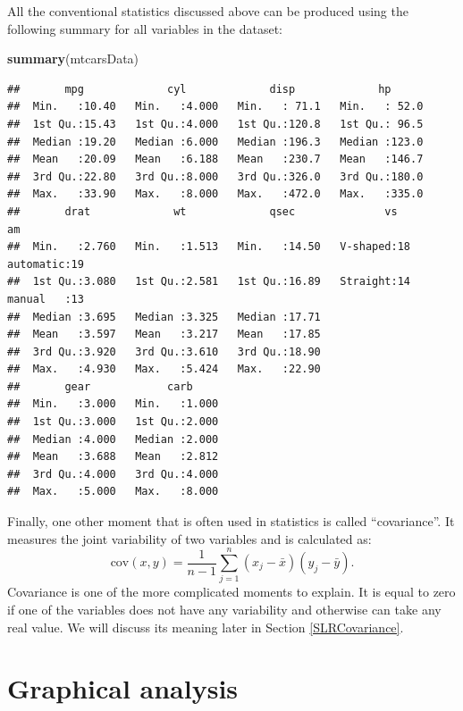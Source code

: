 \documentclass[
]{book}
\newenvironment{Shaded}{\begin{snugshade}}{\end{snugshade}}
\newcommand{\KeywordTok}[1]{\textcolor[rgb]{0.13,0.29,0.53}{\textbf{#1}}}
\newcommand{\NormalTok}[1]{#1}
\theoremstyle{definition}
\theoremstyle{definition}
\theoremstyle{definition}
\theoremstyle{definition}
\theoremstyle{remark}
\begin{document}
All the conventional statistics discussed above can be produced using the following summary for all variables in the dataset:

\begin{Shaded}
\begin{Highlighting}[]
\KeywordTok{summary}\NormalTok{(mtcarsData)}
\end{Highlighting}
\end{Shaded}

\begin{verbatim}
##       mpg             cyl             disp             hp       
##  Min.   :10.40   Min.   :4.000   Min.   : 71.1   Min.   : 52.0  
##  1st Qu.:15.43   1st Qu.:4.000   1st Qu.:120.8   1st Qu.: 96.5  
##  Median :19.20   Median :6.000   Median :196.3   Median :123.0  
##  Mean   :20.09   Mean   :6.188   Mean   :230.7   Mean   :146.7  
##  3rd Qu.:22.80   3rd Qu.:8.000   3rd Qu.:326.0   3rd Qu.:180.0  
##  Max.   :33.90   Max.   :8.000   Max.   :472.0   Max.   :335.0  
##       drat             wt             qsec              vs             am    
##  Min.   :2.760   Min.   :1.513   Min.   :14.50   V-shaped:18   automatic:19  
##  1st Qu.:3.080   1st Qu.:2.581   1st Qu.:16.89   Straight:14   manual   :13  
##  Median :3.695   Median :3.325   Median :17.71                               
##  Mean   :3.597   Mean   :3.217   Mean   :17.85                               
##  3rd Qu.:3.920   3rd Qu.:3.610   3rd Qu.:18.90                               
##  Max.   :4.930   Max.   :5.424   Max.   :22.90                               
##       gear            carb      
##  Min.   :3.000   Min.   :1.000  
##  1st Qu.:3.000   1st Qu.:2.000  
##  Median :4.000   Median :2.000  
##  Mean   :3.688   Mean   :2.812  
##  3rd Qu.:4.000   3rd Qu.:4.000  
##  Max.   :5.000   Max.   :8.000
\end{verbatim}

Finally, one other moment that is often used in statistics is called ``covariance''. It measures the joint variability of two variables and is calculated as:
\begin{equation}
    \mathrm{cov}(x,y)= \frac{1}{n-1}\sum_{j=1}^n (x_j - \bar{x}) (y_j - \bar{y}) .
    \label{eq:Covariance}
\end{equation}
Covariance is one of the more complicated moments to explain. It is equal to zero if one of the variables does not have any variability and otherwise can take any real value. We will discuss its meaning later in Section \ref{SLRCovariance}.

\hypertarget{dataAnalysisGraphical}{%
\section{Graphical analysis}\label{dataAnalysisGraphical}}
\end{document}
